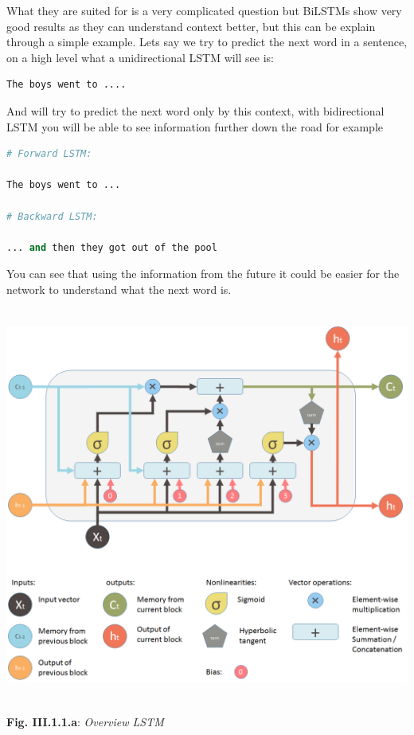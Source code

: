 \documentclass[11pt, a4papper]{report}
\theoremstyle{plain}
\theoremstyle{definition}
\theoremstyle{definition}
\theoremstyle{proposition}
\begin{document}
What they are suited for is a very complicated question but BiLSTMs show very good results as they can understand context better, but this can be explain through a simple example. Lets say we try to predict the next word in a sentence, on a high level what a unidirectional LSTM will see is:
\vspace{0.5cm}
\begin{lstlisting}[language=Python]
The boys went to ....
\end{lstlisting}
\vspace{0.5cm}

And will try to predict the next word only by this context, with bidirectional LSTM you will be able to see information further down the road for example

\vspace{0.5cm}

\begin{lstlisting}[language=Python]
# Forward LSTM:

The boys went to ...

# Backward LSTM:

... and then they got out of the pool
\end{lstlisting}
\vspace{0.5cm}

You can see that using the information from the future it could be easier for the network to understand what the next word is. 

\begin{center}
\includegraphics[width=16cm,height=13cm,keepaspectratio]{LSTM.png}
\end{center}
\begin{center}
\textbf{Fig. III.1.1.a}: \textit{Overview LSTM}
\end{center}
\end{document}
